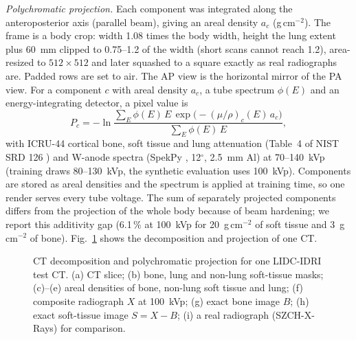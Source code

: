 \emph{Polychromatic projection.} Each component was integrated along the anteroposterior axis (parallel beam), giving an areal density
$a_c$ (g\,cm$^{-2}$). The frame is a body crop: width 1.08 times the body width, height the lung extent plus 60~mm clipped to 0.75--1.2 of
the width (short scans cannot reach 1.2), area-resized to $512\times512$ and later squashed to a square exactly as real radiographs are.
Padded rows are set to air. The AP view is the horizontal mirror of the PA view. For a component $c$ with areal density $a_c$, a tube
spectrum $\phi(E)$ and an energy-integrating detector, a pixel value is
\begin{equation}
P_c=-\ln\frac{\sum_E \phi(E)\,E\,\exp\!\big(-(\mu/\rho)_c(E)\,a_c\big)}{\sum_E\phi(E)\,E},
\label{eq:physics}
\end{equation}
with ICRU-44 \cite{icru1989report44} cortical bone, soft tissue and lung attenuation (Table~4 of NIST SRD 126 \cite{hubbell2004xraymass})
and W-anode spectra (SpekPy \cite{poludniowski2021spekpy}, 12$^\circ$, 2.5~mm Al) at 70--140~kVp (training draws 80--130~kVp, the
synthetic evaluation uses 100~kVp). Components are stored as areal densities and the spectrum is applied at training time, so one render
serves every tube voltage. The sum of separately projected components differs from the projection of the whole body because of beam
hardening; we report this additivity gap (6.1\,\% at 100~kVp for 20~g\,cm$^{-2}$ of soft tissue and 3~g\,cm$^{-2}$ of bone).
Fig.~\ref{fig:pipeline} shows the decomposition and projection of one CT.

\begin{figure}[!t]
\centering
{}
\caption{CT decomposition and polychromatic projection for one LIDC-IDRI test CT. (a) CT slice; (b) bone, lung and non-lung soft-tissue
masks; (c)--(e) areal densities of bone, non-lung soft tissue and lung; (f) composite radiograph $X$ at 100~kVp; (g) exact bone image $B$;
(h) exact soft-tissue image $S=X-B$; (i) a real radiograph (SZCH-X-Rays) for comparison.}
\label{fig:pipeline}
\end{figure}

